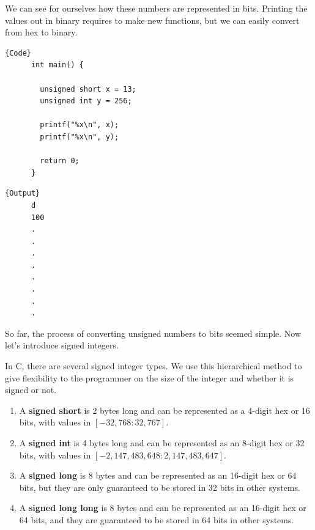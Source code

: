   \begin{example}
    \label{ex:bit-representation-of-unsigned-integers-in-c}
    We can see for ourselves how these numbers are represented in bits. Printing the values out in binary requires to make new functions, but we can easily convert from hex to binary. 

    \noindent\begin{minipage}{.5\textwidth}
    \begin{lstlisting}[]{Code}
      int main() { 

        unsigned short x = 13; 
        unsigned int y = 256;

        printf("%x\n", x);
        printf("%x\n", y);

        return 0; 
      }
    \end{lstlisting}
    \end{minipage}
    \hfill
    \begin{minipage}{.49\textwidth}
    \begin{lstlisting}[]{Output}
      d
      100 
      .
      .
      .
      .
      .
      .
      .
      .
    \end{lstlisting}
    \end{minipage}
  \end{example}

  So far, the process of converting unsigned numbers to bits seemed simple. Now let's introduce signed integers. 

  \begin{definition}
    \label{def:signed-integer-types-in-c}
    In C, there are several signed integer types. We use this hierarchical method to give flexibility to the programmer on the size of the integer and whether it is signed or not. 
    \begin{enumerate} 
      \item A \textbf{signed short} is 2 bytes long and can be represented as a 4-digit hex or 16 bits, with values in $[-32,768: 32,767]$. 
      \item A \textbf{signed int} is 4 bytes long and can be represented as an 8-digit hex or 32 bits, with values in $[-2,147,483,648: 2,147,483,647]$. 
      \item A \textbf{signed long} is 8 bytes and can be represented as an 16-digit hex or 64 bits, but they are only guaranteed to be stored in 32 bits in other systems. 
      \item A \textbf{signed long long} is 8 bytes and can be represented as an 16-digit hex or 64 bits, and they are guaranteed to be stored in 64 bits in other systems. 
    \end{enumerate}
  \end{definition}


